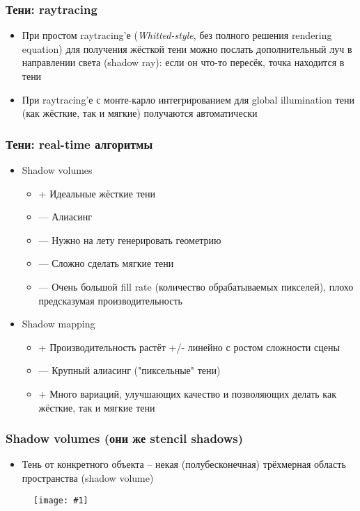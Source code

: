 \documentclass[10pt]{beamer}
\newcommand{\slideimage}[1]{
  \begin{figure}
    \begin{adjustbox}{width=\textwidth, totalheight=\textheight-2\baselineskip-2\baselineskip,keepaspectratio}
      \texttt{[image: \#1]}
    \end{adjustbox}
  \end{figure}
}
\begin{document}
\begin{frame}[fragile]
\frametitle{Тени: raytracing}
\begin{itemize}
\item При простом raytracing'е (\textit{Whitted-style}, без полного решения rendering equation) для получения жёсткой тени можно послать дополнительный луч в направлении света (shadow ray): если он что-то пересёк, точка находится в тени
\pause
\item При raytracing'е с монте-карло интегрированием для global illumination тени (как жёсткие, так и мягкие) получаются автоматически
\end{itemize}
\end{frame}

\begin{frame}[fragile]
\frametitle{Тени: real-time алгоритмы}
\begin{itemize}
\item Shadow volumes
\pause
\begin{itemize}
\item {\color{green}+} Идеальные жёсткие тени
\item {\color{red}---} Алиасинг
\item {\color{red}---} Нужно на лету генерировать геометрию
\item {\color{red}---} Сложно сделать мягкие тени
\item {\color{red}---} Очень большой fill rate (количество обрабатываемых пикселей), плохо предсказумая производительность
\end{itemize}
\pause
\item Shadow mapping
\pause
\begin{itemize}
\item {\color{green}+} Производительность растёт +/- линейно с ростом сложности сцены
\item {\color{red}---} Крупный алиасинг ("пиксельные" тени)
\item {\color{green}+} Много вариаций, улучшающих качество и позволяющих делать как жёсткие, так и мягкие тени
\end{itemize}
\end{itemize}
\end{frame}

\begin{frame}[fragile]
\frametitle{Shadow volumes (они же stencil shadows)}
\begin{itemize}
\item Тень от конкретного объекта -- некая (полубесконечная) трёхмерная область пространства (shadow volume)
\end{itemize}
\slideimage{shadow-volume.png}
\end{frame}
\end{document}
